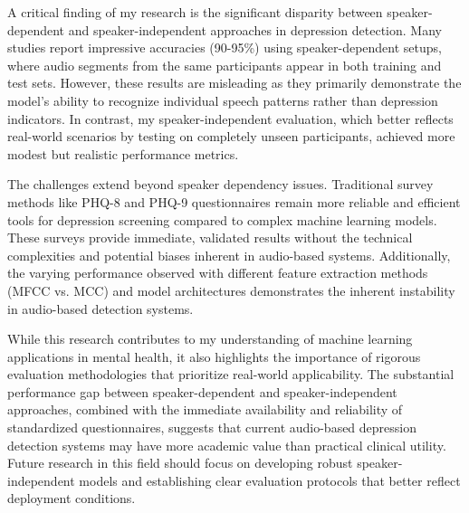 A critical finding of my research is the significant disparity between speaker-dependent and speaker-independent approaches in depression detection. Many studies report impressive accuracies (90-95\%) using speaker-dependent setups, where audio segments from the same participants appear in both training and test sets. However, these results are misleading as they primarily demonstrate the model's ability to recognize individual speech patterns rather than depression indicators. In contrast, my speaker-independent evaluation, which better reflects real-world scenarios by testing on completely unseen participants, achieved more modest but realistic performance metrics.

The challenges extend beyond speaker dependency issues. Traditional survey methods like PHQ-8 and PHQ-9 questionnaires remain more reliable and efficient tools for depression screening compared to complex machine learning models. These surveys provide immediate, validated results without the technical complexities and potential biases inherent in audio-based systems. Additionally, the varying performance observed with different feature extraction methods (MFCC vs. MCC) and model architectures demonstrates the inherent instability in audio-based detection systems.

While this research contributes to my understanding of machine learning applications in mental health, it also highlights the importance of rigorous evaluation methodologies that prioritize real-world applicability. The substantial performance gap between speaker-dependent and speaker-independent approaches, combined with the immediate availability and reliability of standardized questionnaires, suggests that current audio-based depression detection systems may have more academic value than practical clinical utility. Future research in this field should focus on developing robust speaker-independent models and establishing clear evaluation protocols that better reflect deployment conditions.